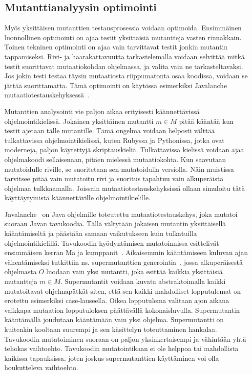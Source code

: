 \documentclass[finnish]{tktltiki2}
\begin{document}
\subsection{Mutanttianalyysin optimointi}
Myös yksittäisen mutanttien testausprosessia voidaan optimoida. Ensimmäinen luonnollinen optimointi on ajaa testit yksittäisiä mutantteja vasten rinnakkain. Toinen tekninen optimointi on ajaa vain tarvittavat testit jonkin mutantin tappamiseksi. Rivi- ja haarakattavuutta tarkastelemalla voidaan selvittää mitkä testit suorittavat mutaatiokohdan ohjelmassa, ja valita vain ne tarkasteltavaksi. Jos jokin testi testaa täysin mutaatiosta riippumatonta osaa koodissa, voidaan se jättää suorittamatta. Tämä optimointi on käytössä esimerkiksi Javalanche mutaatiotestauskehyksessä~\cite{SchulerZ09}.

Mutanttien analysointi vie paljon aikaa erityisesti käännettävissä ohjelmointikielissä. Jokainen yksittäinen mutantti $m\in M$ pitää kääntää kun testit ajetaan tälle mutantille. Tämä ongelma voidaan helposti välttää tulkattavissa ohjelmointikielissä, kuten Rubyssa ja Pythonissa, jotka ovat moderneja, paljon käytettyjä skriptauskieliä. Tulkattavissa kielissä voidaan ajaa ohjelmakoodi sellaisenaan, pitäen mielessä mutaatiokohta. Kun saavutaan mutatoidulle riville, se suoritetaan sen mutatoidulla versiolla. Näin muistissa tarvitsee pitää vain mutatoitu rivi ja suoritus tapahtuu vain alkuperäistä ohjelmaa tulkkaamalla. Joissain mutaatiotestauskehyksissä ollaan simuloitu tätä käyttäytymistä käännettäville ohjelmointikielille. 

Javalanche~\cite{SchulerZ09} on Java ohjelmille toteutettu mutaatiotestauskehys, joka mutatoi suoraan Javan tavukoodia. Tällä vältytään jokaisen mutantin yksittäisellä kääntämiseltä ja päästään samaan vaikutukseen kuin tulkatuilla ohjelmointikielillä. Tavukoodin hyödyntämisen mutatoinnissa esittelivät ensimmäisen kerran Ma ja kumppanit~\cite{MaOK05}. Aikaisemmin kääntämiseen kuluvan ajan vähentämiseksi tutkittiin ns. supermutanttien generointia~\cite{Untch}, jossa alkuperäisestä ohjelmasta $O$ luodaan vain yksi mutantti, joka esittää kaikkia yksittäisiä mutantteja $m\in M$. Supermutantit voidaan kuvata abstraktoimalla kaikki mutatoitavat ohjelmapätkät siten, että sen kaikki mahdolliset lopputulemat on erotettu esimerkiksi case-lauseella. Oikea lopputulema valitaan ajon aikana vaikkapa mutaation lopputuloksen päättävällä kokonaisluvulla. Supermutantin kääntämällä joudutaan kääntämään vain yksi ohjelma. Supermutantti on kuitenkin kooltaan suurempi ja sen käsittelyn toteuttaminen hankalaa. Tavukoodin mutatoiminen suoraan on paljon yksinkertaisempi ja vähintään yhtä tehokas vaihtoehto. Tavukoodin mutatointikaan ei ole helppoa tai mahdollista kaikissa tapauksissa, joten joskus supermutanttien käyttäminen voi olla houkutteleva vaihtoehto.
\end{document}
